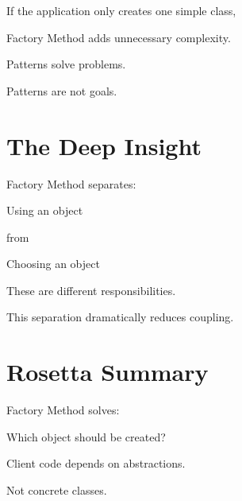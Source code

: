 \documentclass[11pt,a4paper]{book}
\begin{document}
\begin{trap}

If the application only creates one simple class,

Factory Method adds unnecessary complexity.

\end{trap}

Patterns solve problems.

Patterns are not goals.


\section{The Deep Insight}

\begin{idea}

Factory Method separates:

\begin{center}
Using an object
\end{center}

from

\begin{center}
Choosing an object
\end{center}

These are different responsibilities.

\end{idea}

This separation dramatically reduces coupling.


\section{Rosetta Summary}

\begin{rosettarule}

Factory Method solves:

\begin{center}
Which object should be created?
\end{center}

\end{rosettarule}

\begin{rosettarule}

Client code depends on abstractions.

Not concrete classes.

\end{rosettarule}
\end{document}
